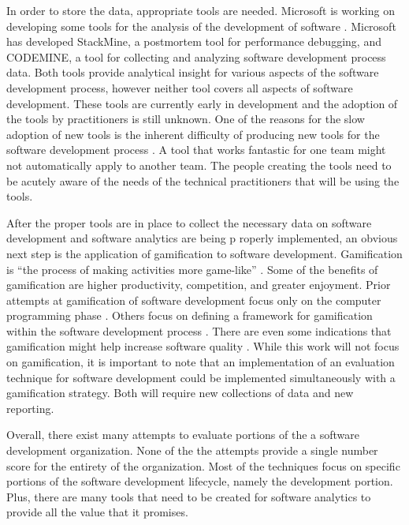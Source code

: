 \documentclass[SDSUThesis.tex]{subfiles}
\begin{document}
    In order to store the data, appropriate tools are needed.  Microsoft
    is working on developing some tools for the analysis of the development
    of software \cite{Czerwonka2013,Zhang2013}.  Microsoft has developed
    StackMine, a postmortem tool for performance debugging, and CODEMINE,
    a tool for collecting and analyzing software development process data.
    Both tools provide analytical insight for various aspects of the 
    software development process, however neither tool covers all aspects
    of software development.
    These tools are currently early in development and the adoption of the
    tools by practitioners is still unknown. One of the reasons for the slow
    adoption of new tools is the inherent difficulty of producing
    new tools for the software development process \cite{Spraragen2005}. A 
    tool that works fantastic for one team might not automatically apply to 
    another team.  The people creating the tools need to be acutely aware
    of the needs of the technical practitioners that will be using the
    tools.  

    After the proper tools are in place to collect the necessary
    data on software development and software analytics are being
    p roperly implemented, an obvious next step is the
    application of gamification to software development. Gamification
    is ``the process of making activities more game-like'' \cite{Werbach2014}.
    Some of the benefits of gamification are higher productivity, competition,
    and greater enjoyment.  
    Prior attempts
    at gamification of software development focus only on 
    the computer programming phase \cite{Snipes2013}. Others
    focus on defining a framework for gamification within
    the software development process \cite{Jain2013}. There are 
    even some indications that gamification might help increase
    software quality \cite{Dubois2013}. 
    While this work will not focus on gamification, it is important to note
    that an implementation of an evaluation technique for software
    development could be implemented simultaneously with a gamification
    strategy. Both will require new collections of data and new reporting.

    Overall, there exist many attempts to 
    evaluate portions of the a software development 
    organization.  None of the the attempts provide
    a single number score for the entirety of the 
    organization.  Most of the techniques focus on
    specific portions of the software development 
    lifecycle, namely the development portion. Plus,
    there are many tools that need to be created for
    software analytics to provide all the value
    that it promises.
\end{document}
